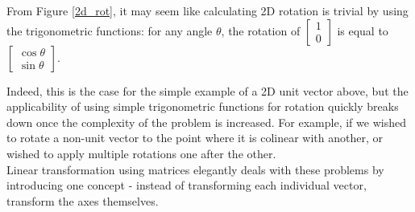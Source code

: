 \documentclass[12pt, a4paper]{article}
\begin{document}
From Figure \ref{2d_rot}, it may seem like calculating 2D rotation is trivial by
using the trigonometric functions: for any angle $\theta$, the rotation of
$\begin{bmatrix}1 \\ 0\end{bmatrix}$ is equal to $\begin{bmatrix}\cos\theta \\
        \sin\theta\end{bmatrix}$. \vspace{0.2cm}

Indeed, this is the case for the simple example of a 2D unit vector above, but
the applicability of using simple trigonometric functions for rotation quickly
breaks down once the complexity of the problem is increased. For example, if we
wished to rotate a non-unit vector to the point where it is colinear with
another, or wished to apply multiple rotations one after the other. \\

Linear transformation using matrices elegantly deals with these problems by
introducing one concept - instead of transforming each individual vector,
transform the axes themselves. \\
\end{document}
